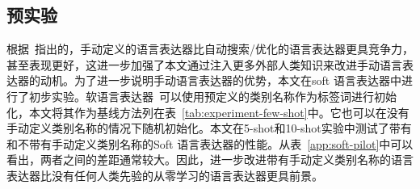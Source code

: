 \subsection{预实验}
\begin{table}[!htbp]
\caption{软语言表达器的预实验证明了在语言表达器中融入人类专家知识的必要性。SOFT是使用类名的软语言表达器，而SOFT w.o. M是不使用手动语言表达器的变体。}
\begin{center}
\end{center}
\label{app:soft-pilot}
\end{table}

根据~\citep{gao2020making}指出的，手动定义的语言表达器比自动搜索/优化的语言表达器更具竞争力，甚至表现更好，这进一步加强了本文通过注入更多外部人类知识来改进手动语言表达器的动机。为了进一步说明手动语言表达器的优势，本文在soft 语言表达器中进行了初步实验。软语言表达器~\cite{hambardzumyan-etal-2021-warp}可以使用预定义的类别名称作为标签词进行初始化，本文将其作为基线方法列在表~\ref{tab:experiment-few-shot}中。它也可以在没有手动定义类别名称的情况下随机初始化。本文在5-shot和10-shot实验中测试了带有和不带有手动定义类别名称的Soft 语言表达器的性能。从表~\ref{app:soft-pilot}中可以看出，两者之间的差距通常较大。因此，进一步改进带有手动定义类别名称的语言表达器比没有任何人类先验的从零学习的语言表达器更具前景。



